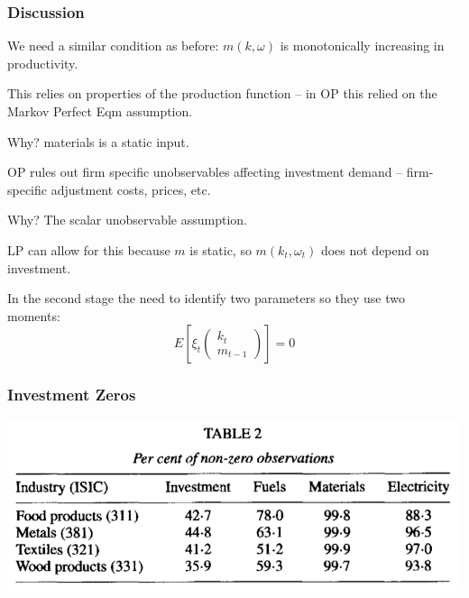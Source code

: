 \documentclass[11pt, aspectratio=169]{beamer}
\newenvironment{wideitemize}{\itemize\addtolength{\itemsep}{10pt}}{\enditemize}
\newenvironment{wideenumerate}{\enumerate\addtolength{\itemsep}{10pt}}{\endenumerate}
\begin{document}
\begin{frame}[c]\frametitle{Discussion}
    
\begin{wideenumerate}
	\item We need a similar condition as before: $m(k,\omega)$ is monotonically increasing in productivity.
	\begin{wideitemize}
		\item This relies on properties of the production function -- in OP this relied on the Markov Perfect Eqm assumption. 
		\item Why? materials is a static input.
	\end{wideitemize}
	\item OP rules out firm specific unobservables affecting investment demand -- firm-specific adjustment costs, prices, etc. 
	\begin{wideitemize}
		\item Why? The scalar unobservable assumption. 
		\item LP can allow for this because $m$ is static, so $m(k_t,\omega_t)$ does not depend on investment. 	
	\end{wideitemize}
	\item In the second stage the need to identify two parameters so they use two moments: 
	$$E[\xi_t 
	\begin{pmatrix}
	k_t \\
	m_{t-1}
	\end{pmatrix}
	]=0$$
\end{wideenumerate}

\end{frame}


\begin{frame}[c]\frametitle{Investment Zeros}

\centering    
\includegraphics[height=.5\textheight]{LP-Table2.png}

\end{frame}
\end{document}
